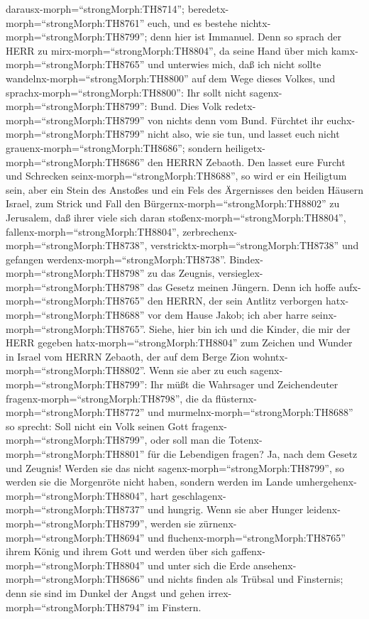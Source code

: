 darausx-morph=``strongMorph:TH8714'';
beredetx-morph=``strongMorph:TH8761'' euch, und es bestehe
nichtx-morph=``strongMorph:TH8799''; denn hier ist Immanuel.
 Denn so sprach der HERR zu
mirx-morph=``strongMorph:TH8804'', da seine Hand über mich
kamx-morph=``strongMorph:TH8765'' und unterwies mich, daß ich nicht
sollte wandelnx-morph=``strongMorph:TH8800'' auf dem Wege dieses Volkes,
und sprachx-morph=``strongMorph:TH8800'':  Ihr sollt nicht
sagenx-morph=``strongMorph:TH8799'': Bund. Dies Volk
redetx-morph=``strongMorph:TH8799'' von nichts denn vom Bund. Fürchtet
ihr euchx-morph=``strongMorph:TH8799'' nicht also, wie sie tun, und
lasset euch nicht grauenx-morph=``strongMorph:TH8686''; 
sondern heiligetx-morph=``strongMorph:TH8686'' den HERRN Zebaoth. Den
lasset eure Furcht und Schrecken seinx-morph=``strongMorph:TH8688'',
 so wird er ein Heiligtum sein, aber ein Stein des Anstoßes
und ein Fels des Ärgernisses den beiden Häusern Israel, zum Strick und
Fall den Bürgernx-morph=``strongMorph:TH8802'' zu Jerusalem,
 daß ihrer viele sich daran
stoßenx-morph=``strongMorph:TH8804'',
fallenx-morph=``strongMorph:TH8804'',
zerbrechenx-morph=``strongMorph:TH8738'',
verstricktx-morph=``strongMorph:TH8738'' und gefangen
werdenx-morph=``strongMorph:TH8738''. 
Bindex-morph=``strongMorph:TH8798'' zu das Zeugnis,
versieglex-morph=``strongMorph:TH8798'' das Gesetz meinen Jüngern.
 Denn ich hoffe aufx-morph=``strongMorph:TH8765'' den
HERRN, der sein Antlitz verborgen hatx-morph=``strongMorph:TH8688'' vor
dem Hause Jakob; ich aber harre seinx-morph=``strongMorph:TH8765''.
 Siehe, hier bin ich und die Kinder, die mir der HERR
gegeben hatx-morph=``strongMorph:TH8804'' zum Zeichen und Wunder in
Israel vom HERRN Zebaoth, der auf dem Berge Zion
wohntx-morph=``strongMorph:TH8802''.  Wenn sie aber zu euch
sagenx-morph=``strongMorph:TH8799'': Ihr müßt die Wahrsager und
Zeichendeuter fragenx-morph=``strongMorph:TH8798'', die da
flüsternx-morph=``strongMorph:TH8772'' und
murmelnx-morph=``strongMorph:TH8688'' so sprecht: Soll nicht ein Volk
seinen Gott fragenx-morph=``strongMorph:TH8799'', oder soll man die
Totenx-morph=``strongMorph:TH8801'' für die Lebendigen fragen?
 Ja, nach dem Gesetz und Zeugnis! Werden sie das nicht
sagenx-morph=``strongMorph:TH8799'', so werden sie die Morgenröte nicht
haben,  sondern werden im Lande
umhergehenx-morph=``strongMorph:TH8804'', hart
geschlagenx-morph=``strongMorph:TH8737'' und hungrig. Wenn sie aber
Hunger leidenx-morph=``strongMorph:TH8799'', werden sie
zürnenx-morph=``strongMorph:TH8694'' und
fluchenx-morph=``strongMorph:TH8765'' ihrem König und ihrem Gott
 und werden über sich gaffenx-morph=``strongMorph:TH8804''
und unter sich die Erde ansehenx-morph=``strongMorph:TH8686'' und nichts
finden als Trübsal und Finsternis; denn sie sind im Dunkel der Angst und
gehen irrex-morph=``strongMorph:TH8794'' im Finstern.

